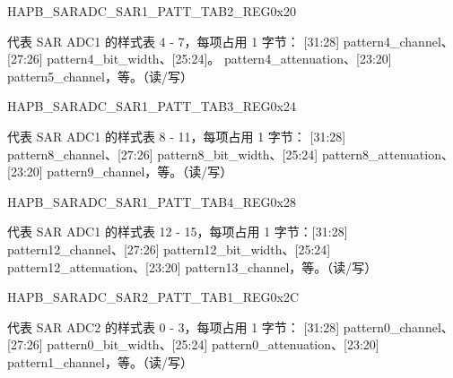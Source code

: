 \begin{register}{H}{APB\_SARADC\_SAR1\_PATT\_TAB2\_REG}{0x20}\label{regdesc:APBSARADCSAR1PATTTAB2REG}
%
\regnewline%
\begin{regdesc}\begin{reglist}
\item [APB\_SARADC\_SAR1\_PATT\_TAB2\_REG] 代表 SAR ADC1 的样式表 4 - 7，每项占用 1 字节： [31:28] pattern4\_channel、[27:26] pattern4\_bit\_width、[25:24]。 pattern4\_attenuation、[23:20] pattern5\_channel，等。（读/写）
\end{reglist}\end{regdesc}
\end{register}


\begin{register}{H}{APB\_SARADC\_SAR1\_PATT\_TAB3\_REG}{0x24}\label{regdesc:APBSARADCSAR1PATTTAB3REG}
%
\regnewline%
\begin{regdesc}\begin{reglist}
\item [APB\_SARADC\_SAR1\_PATT\_TAB3\_REG] 代表 SAR ADC1 的样式表 8 - 11，每项占用 1 字节： [31:28] pattern8\_channel、[27:26] pattern8\_bit\_width、[25:24] pattern8\_attenuation、 [23:20] pattern9\_channel，等。（读/写）
\end{reglist}\end{regdesc}
\end{register}


\begin{register}{H}{APB\_SARADC\_SAR1\_PATT\_TAB4\_REG}{0x28}\label{regdesc:APBSARADCSAR1PATTTAB4REG}
%
\regnewline%
\begin{regdesc}\begin{reglist}
\item [APB\_SARADC\_SAR1\_PATT\_TAB4\_REG] 代表 SAR ADC1 的样式表 12 - 15，每项占用 1 字节：[31:28] pattern12\_channel、[27:26] pattern12\_bit\_width、[25:24] pattern12\_attenuation、[23:20] pattern13\_channel，等。（读/写）
\end{reglist}\end{regdesc}
\end{register}


\begin{register}{H}{APB\_SARADC\_SAR2\_PATT\_TAB1\_REG}{0x2C}\label{regdesc:APBSARADCSAR2PATTTAB1REG}
%
\regnewline%
\begin{regdesc}\begin{reglist}
\item [APB\_SARADC\_SAR2\_PATT\_TAB1\_REG] 代表 SAR ADC2 的样式表 0 - 3，每项占用 1 字节： [31:28] pattern0\_channel、[27:26] pattern0\_bit\_width、[25:24] pattern0\_attenuation、[23:20] pattern1\_channel，等。（读/写）
\end{reglist}\end{regdesc}
\end{register}


